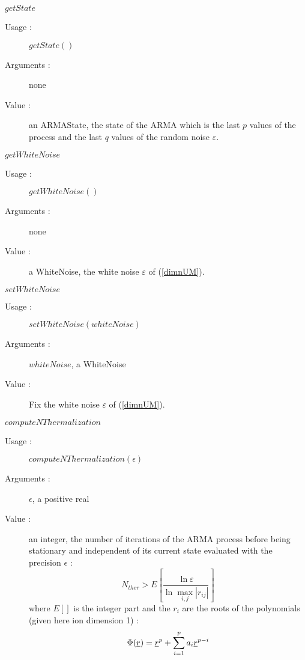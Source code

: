 \begin{description}
\begin{description}
  \item $getState$
    \begin{description}
    \item[Usage :] $getState()$
    \item[Arguments :] none
    \item[Value :] an ARMAState, the state of the ARMA  which is the last  $p$ values of the process and the last $q$ values of the  random noise $\varepsilon$.
    \end{description}
    \bigskip

  \item $getWhiteNoise$
    \begin{description}
    \item[Usage :] $getWhiteNoise()$
    \item[Arguments :] none
    \item[Value :] a WhiteNoise,  the white noise $\varepsilon$ of (\ref{dimnUM}).
    \end{description}
    \bigskip

  \item $setWhiteNoise$
    \begin{description}
    \item[Usage :] $setWhiteNoise(whiteNoise)$
    \item[Arguments :] $whiteNoise$, a WhiteNoise
    \item[Value :] Fix the white noise $\varepsilon$ of (\ref{dimnUM}).
    \end{description}
    \bigskip

  \item $computeNThermalization$
    \begin{description}
    \item[Usage :] $computeNThermalization(\epsilon)$
    \item[Arguments :] $\epsilon$, a positive real 
    \item[Value :] an integer, the number of iterations of the ARMA process before being stationary and independent of its current state evaluated with the precision $\epsilon$ : 
\begin{equation}\label{nTher}
   N_{ther} > E[ \displaystyle \frac{\ln  \varepsilon}{\ln \max_{i,j} |r_{ij}|}]
\end{equation}
where  $E[]$ is the integer part and the $r_i$ are the roots of the polynomials (given here ion dimension 1) :
\begin{equation}\label{PolPhi}
\Phi({\underline{r}}) = {\underline{r}}^p + \sum_{i=1}^p a_i{\underline{r}}^{p-i} 
\end{equation}



\end{description}
\end{description}
\end{description}
